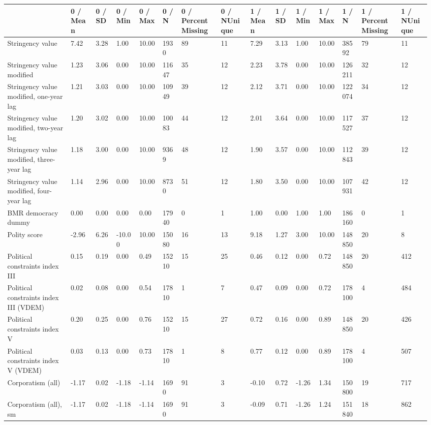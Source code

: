 
\begin{longtable}{lllllllllllllll}
\toprule
  & 0 / Mean & 0 / SD & 0 / Min & 0 / Max & 0 / N & 0 / PercentMissing & 0 / NUnique & 1 / Mean & 1 / SD & 1 / Min & 1 / Max & 1 / N & 1 / PercentMissing & 1 / NUnique\\
\midrule
Stringency value & 7.42 & 3.28 & 1.00 & 10.00 & 1930 & 89 & 11 & 7.29 & 3.13 & 1.00 & 10.00 & 38592 & 79 & 11\\
Stringency value modified & 1.23 & 3.06 & 0.00 & 10.00 & 11647 & 35 & 12 & 2.23 & 3.78 & 0.00 & 10.00 & 126211 & 32 & 12\\
Stringency value modified, one-year lag & 1.21 & 3.03 & 0.00 & 10.00 & 10949 & 39 & 12 & 2.12 & 3.71 & 0.00 & 10.00 & 122074 & 34 & 12\\
Stringency value modified, two-year lag & 1.20 & 3.02 & 0.00 & 10.00 & 10083 & 44 & 12 & 2.01 & 3.64 & 0.00 & 10.00 & 117527 & 37 & 12\\
Stringency value modified, three-year lag & 1.18 & 3.00 & 0.00 & 10.00 & 9369 & 48 & 12 & 1.90 & 3.57 & 0.00 & 10.00 & 112843 & 39 & 12\\
\addlinespace
Stringency value modified, four-year lag & 1.14 & 2.96 & 0.00 & 10.00 & 8730 & 51 & 12 & 1.80 & 3.50 & 0.00 & 10.00 & 107931 & 42 & 12\\
BMR democracy dummy & 0.00 & 0.00 & 0.00 & 0.00 & 17940 & 0 & 1 & 1.00 & 0.00 & 1.00 & 1.00 & 186160 & 0 & 1\\
Polity score & -2.96 & 6.26 & -10.00 & 10.00 & 15080 & 16 & 13 & 9.18 & 1.27 & 3.00 & 10.00 & 148850 & 20 & 8\\
Political constraints index III & 0.15 & 0.19 & 0.00 & 0.49 & 15210 & 15 & 25 & 0.46 & 0.12 & 0.00 & 0.72 & 148850 & 20 & 412\\
Political constraints index III (VDEM) & 0.02 & 0.08 & 0.00 & 0.54 & 17810 & 1 & 7 & 0.47 & 0.09 & 0.00 & 0.72 & 178100 & 4 & 484\\
\addlinespace
Political constraints index V & 0.20 & 0.25 & 0.00 & 0.76 & 15210 & 15 & 27 & 0.72 & 0.16 & 0.00 & 0.89 & 148850 & 20 & 426\\
Political constraints index V (VDEM) & 0.03 & 0.13 & 0.00 & 0.73 & 17810 & 1 & 8 & 0.77 & 0.12 & 0.00 & 0.89 & 178100 & 4 & 507\\
Corporatism (all) & -1.17 & 0.02 & -1.18 & -1.14 & 1690 & 91 & 3 & -0.10 & 0.72 & -1.26 & 1.34 & 150800 & 19 & 717\\
Corporatism (all), sm & -1.17 & 0.02 & -1.18 & -1.14 & 1690 & 91 & 3 & -0.09 & 0.71 & -1.26 & 1.24 & 151840 & 18 & 862\\

\end{longtable}
